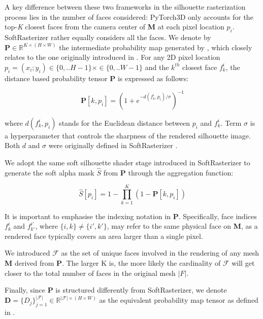 A key difference between these two frameworks in the silhouette rasterization process lies in the number of faces considered: PyTorch3D only accounts for the top-\textit{K} closest faces from the camera center of \textbf{M} at each pixel location $p_i$. SoftRasterizer rather equally considers all the faces. 
We denote by $\mathbf{P}\in \mathbb{R}^{K\times(H\times W)}$ the intermediate probability map generated by \citep{ravi2020accelarating}, which closely relates to the one originally introduced in \citep{liu2019soft}. For any 2D pixel location $p_{i}=(x_{i};y_{i}) \in \{0,..H-1\}\times\in \{0,..W-1\} $ and the $k^{th}$ closest face $f_{k}^{i}$, the distance based probability tensor $\mathbf{P}$ is expressed as follows:

\begin{equation}
    \mathbf{P}[k,p_{i}]=\left(1+e^{-d(f_{k}^{i},p_{i})/\sigma}\right)^{-1} 
\end{equation}

where $d(f_{k}^{i},p_{i})$ stands for the Euclidean distance between $p_i$ and $f_{k}^{i}$. Term $\sigma$ is a hyperparameter that controls the sharpness of the rendered silhouette image. Both $d$ and $\sigma$ were originally defined in SoftRasterizer \citep{liu2019soft}. \newline

We adopt the same soft silhouette shader stage introduced in SoftRasterizer to generate the soft alpha mask $\hat{S}$ from $\mathbf{P}$ through the aggregation function:

\begin{equation}
    \hat{S}[p_i]=1 - \prod_{k=1}^{K} (1 - \mathbf{P}[k,p_{i}])
\end{equation}

It is important to emphasise the indexing notation in $\mathbf{P}$. Specifically, face indices $f_{k}^{i}$ and $f_{k'}^{i'}$, where $\{i,k\} \neq \{i',k'\}$,  may refer to the same physical face on \textbf{M}, as a rendered face typically covers an area larger than a single pixel. 

We introduced $\mathcal{F}$ as the set of unique faces involved in the rendering of any mesh \textbf{M} derived from $\mathbf{P}$. The larger K is, the more likely the cardinality of $\mathcal{F}$ will get closer to the total number of faces in the original mesh $|F|$. 

Finally, since $\mathbf{P}$ is structured differently from SoftRasterizer, we denote $\mathbf{D}=\{D_{j}\}_{j=1}^{|\mathcal{F}|}\in \mathbb{R}^{|\mathcal{F}|\times(H\times W)}$  as the equivalent probability map tensor as defined in \citep{liu2019soft}.

